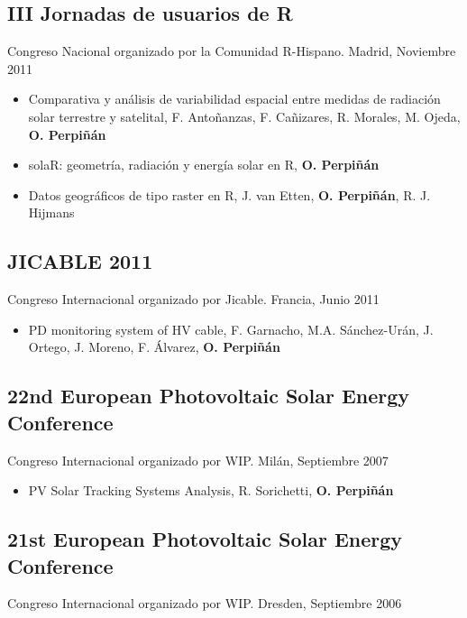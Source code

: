\documentclass[article, a4paper]{memoir}
\begin{document}
\subsection{III Jornadas de usuarios de R}
\label{sec:orgaf18028}
Congreso Nacional organizado por la Comunidad R-Hispano. Madrid, Noviembre 2011

\begin{itemize}
\item Comparativa y análisis de variabilidad espacial entre medidas de radiación solar terrestre y satelital, F. Antoñanzas, F. Cañizares, R. Morales, M. Ojeda, \textbf{O. Perpiñán}

\item solaR: geometría, radiación y energía solar en R, \textbf{O. Perpiñán}

\item Datos geográficos de tipo raster en R, J. van Etten, \textbf{O. Perpiñán}, R. J. Hijmans
\end{itemize}

\subsection{JICABLE 2011}
\label{sec:orgb253ee8}
Congreso Internacional organizado por Jicable. Francia, Junio 2011

\begin{itemize}
\item PD monitoring system of HV cable, F. Garnacho, M.A. Sánchez-Urán, J. Ortego, J. Moreno, F. Álvarez, \textbf{O. Perpiñán}
\end{itemize}

\subsection{22nd European Photovoltaic Solar Energy Conference}
\label{sec:orgc5fe7ba}
Congreso Internacional organizado por WIP. Milán, Septiembre 2007

\begin{itemize}
\item PV Solar Tracking Systems Analysis, R. Sorichetti, \textbf{O. Perpiñán}
\end{itemize}

\subsection{21st European Photovoltaic Solar Energy Conference}
\label{sec:org0709810}
Congreso Internacional organizado por WIP. Dresden, Septiembre 2006
\end{document}
